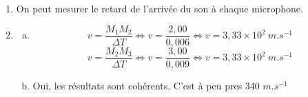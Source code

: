 \documentclass[12pt, a4paper]{article}
\begin{document}
    \begin{Exercise}[number={25}]
        \begin{enumerate}[1.]
            \item On peut mesurer le retard de l'arrivée du son à chaque microphone.
            \item   \begin{enumerate}[a.]
                        \item   \begin{equation*}
                                    v=\frac{M_1M_2}{\Delta T}
                                    \iff v=\frac{2{,}00}{0{,}006}
                                    \iff v=3{,}33\times 10^2\ \si{m.s^{-1}}
                                \end{equation*}
                                \begin{equation*}
                                    v=\frac{M_2M_3}{\Delta T}
                                    \iff v=\frac{3{,}00}{0{,}009}
                                    \iff v=3{,}33\times 10^2\ \si{m.s^{-1}}
                                \end{equation*}
                        \item Oui, les résultats sont cohérents. C'est à peu pres 340 $\si{m.s^{-1}}$
                    \end{enumerate}
        \end{enumerate}
    \end{Exercise}
\end{document}
